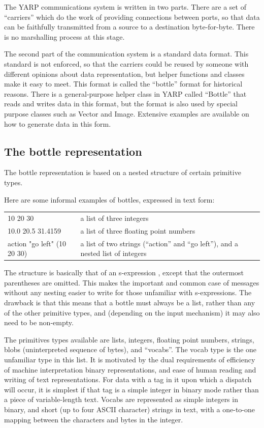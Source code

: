The YARP communications system is written in two parts.  There
are a set of ``carriers'' which do the work of providing
connections between ports, so that data can be faithfully 
transmitted from a source to a destination byte-for-byte.
There is no marshalling process at this stage.

The second part of the communication system is a standard data format.
This standard is not enforced, so that the carriers could be reused by
someone with different opinions about data representation, but helper
functions and classes make it easy to meet.  This format is called the
``bottle'' format for historical reasons.  There is a general-purpose
helper class in YARP called ``Bottle'' that reads and writes data in
this format, but the format is also used by special purpose classes
such as Vector and Image.  Extensive examples are available on how
to generate data in this form.

\subsection{The bottle representation}

The bottle representation is based on a nested structure of certain
primitive types.  

Here are some informal examples of bottles, expressed in text form:

\begin{tabular}{p{5cm}p{6cm}}
10 20 30 & a list of three integers \\
10.0 20.5 31.4159 & a list of three floating point numbers \\
action "go left" (10 20 30) & a list of two strings (``action'' and ``go left''), and a nested list of integers
\end{tabular}

The structure is basically that of an s-expression
\cite{rivest1997sexp}, except that the outermost parentheses are
omitted.  This makes the important and common case of messages without
any nesting easier to write for those unfamiliar with s-expressions.
The drawback is that this means that a bottle must always be a list,
rather than any of the other primitive types, and (depending on the
input mechanism) it may also need to be non-empty.

The primitives types available are lists, integers, floating point
numbers, strings, blobs (uninterpreted sequence of bytes), and
``vocabs''.  The vocab type is the one unfamiliar type in this list.
It is motivated by the dual requirements of efficiency of machine
interpretation binary representations, and ease of human reading and
writing of text representations.  For data with a tag in it upon which
a dispatch will occur, it is simplest if that tag is a simple integer
in binary mode rather than a piece of variable-length text.
Vocabs are represented as simple integers in binary, and short
(up to four ASCII character) strings in text, with a one-to-one
mapping between the characters and bytes in the integer.  


